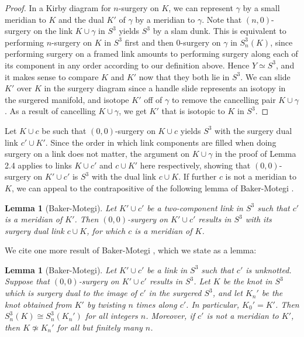 \documentclass[11pt,usenames,dvipsnames,reqno]{amsart}
\numberwithin{theorem}{section}
\newtheorem{lemma}[theorem]{Lemma}
\theoremstyle{ex}
\theoremstyle{rem}
\begin{document}
\begin{proof}
	In a Kirby diagram for $n$-surgery on $K$, we can represent $\gamma$ by a small meridian to $K$ and the dual $K'$ of $\gamma$ by a meridian to $\gamma$. Note that $(n, 0)$-surgery on the link $K \cup \gamma$ in $S^3$ yields $S^3$ by a slam dunk. This is equivalent to performing $n$-surgery on $K$ in $S^3$ first and then $0$-surgery on $\gamma$ in $S^3_n(K)$, since performing surgery on a framed link amounts to performing surgery along each of its component in any order according to our definition above. Hence $Y \simeq S^3$, and it makes sense to compare $K$ and $K'$ now that they both lie in $S^3$. We can slide $K'$ over $K$ in the surgery diagram since a handle slide represents an isotopy in the surgered manifold, and isotope $K'$ off of $\gamma$ to remove the cancelling pair $K\cup \gamma$. As a result of cancelling $K\cup \gamma$, we get $K'$ that is isotopic to $K$ in $S^3$. 
\end{proof}

Let $K \cup c$ be such that $(0, 0)$-surgery on $K \cup c$ yields $S^3$ with the surgery dual link $c' \cup K'$. Since the order in which link components are filled when doing surgery on a link does not matter, the argument on $K\cup \gamma$ in the proof of Lemma 2.4 applies to links $K\cup c'$ and $c\cup K'$ here respectively, showing that $(0,0)$-surgery on $K'\cup c'$ is $S^3$ with the dual link $c\cup K$. If further $c$ is not a meridian to $K$, we can appeal to the contrapositive of the following lemma of Baker-Motegi \cite[Lemma 2.4]{baker-motegi}. 

\begin{lemma}[Baker-Motegi]
	Let $K'\cup c'$ be a two-component link in $S^3$ such that $c'$ is a meridian of $K'$. Then $(0,0)$-surgery on $K'\cup c'$ results in $S^3$ with its surgery dual link $c\cup K$, for which $c$ is a meridian of $K$.
\end{lemma}
	
We cite one more result of Baker-Motegi \cite[Theorem 2.1]{baker-motegi}, which we state as a lemma:

\begin{lemma}[Baker-Motegi]
	Let $K'\cup c'$ be a link in $S^3$ such that $c'$ is unknotted. Suppose that $(0,0)$-surgery on $K'\cup c'$ results in $S^3$. Let $K$ be the knot in $S^3$ which is surgery dual to the image of $c'$ in the surgered $S^3$, and let $K_n'$ be the knot obtained from $K'$ by twisting $n$ times along $c'$. In particular, $K_0'=K'$. Then $S^3_n(K)\cong S^3_n(K_n')$ for all integers $n$. Moreover, if $c'$ is not a meridian to $K'$, then $K\not\simeq K_n'$ for all but finitely many $n$.
\end{lemma}
\end{document}

